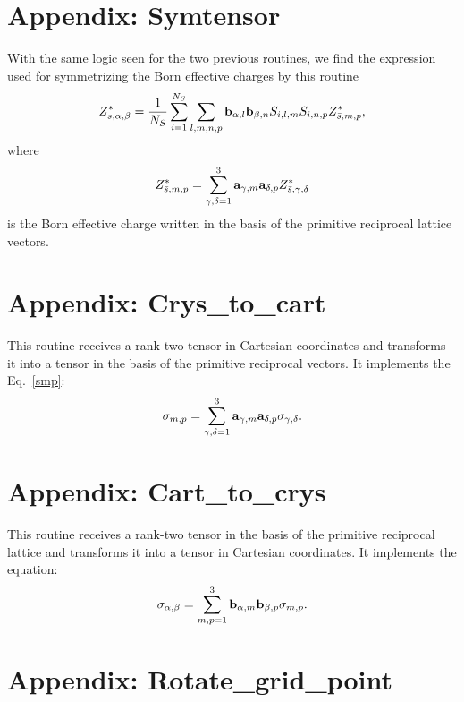 \documentclass[12pt,a4paper,twoside]{report}
\begin{document}
\section{Appendix: Symtensor}
With the same logic seen for the two previous routines, 
we find the expression used for symmetrizing the
Born effective charges by this routine
\begin{equation}
Z^*_{s,\alpha,\beta}={1 \over N_S} \sum_{i=1}^{N_S}
 \sum_{l, m, n, p} {\bf b}_{\alpha,l} {\bf b}_{\beta,n}S_{i,l,m} S_{i,n,p} Z^*_{\bar s,m,p},
\end{equation}
where 
\begin{equation}
Z^*_{\bar s,m,p} = \sum_{\gamma, \delta=1}^3 {\bf a}_{\gamma,m} {\bf a}_{\delta,p} Z^*_{\bar s,\gamma,\delta}
\end{equation}
is the Born effective charge written in the basis of the primitive reciprocal lattice vectors.

\section{Appendix: Crys\_to\_cart}
This routine receives a rank-two tensor in Cartesian coordinates and transforms it into a tensor in the basis of the primitive reciprocal vectors. It implements the Eq.~\ref{smp}:
\begin{equation}
\sigma_{m,p}=\sum_{\gamma, \delta=1}^3
{\bf a}_{\gamma,m} {\bf a}_{\delta,p} \sigma_{\gamma,\delta}.
\end{equation}

\section{Appendix: Cart\_to\_crys}
This routine receives a rank-two tensor in the basis of the primitive reciprocal lattice and transforms it into a tensor in Cartesian coordinates. It implements the equation:
\begin{equation}
\sigma_{\alpha,\beta}=\sum_{m,p=1}^3
{\bf b}_{\alpha,m} {\bf b}_{\beta,p} \sigma_{m,p}.
\end{equation}

\section{Appendix: Rotate\_grid\_point}
\end{document}
